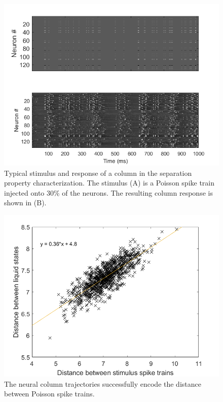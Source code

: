 \documentclass[a4paper,11pt]{article}
\begin{document}
\begin{figure}[p]
 \caption{Typical stimulus and response of a column in the separation property characterization. The stimulus (A) is a Poisson spike train injected onto 30\% of the neurons. The resulting column response is shown in (B).}
 \label{fig:reservoir_response}
 \centering
   \includegraphics[width=\textwidth]{fig/ReservoirResponse}
\end{figure}

\begin{figure}[p]
 \caption{The neural column trajectories successfully encode the distance between Poisson spike trains.}
 \label{fig:distance}
 \centering
   \includegraphics[width=\textwidth]{fig/Distance}
\end{figure}


\clearpage
\printbibliography
\end{document}
